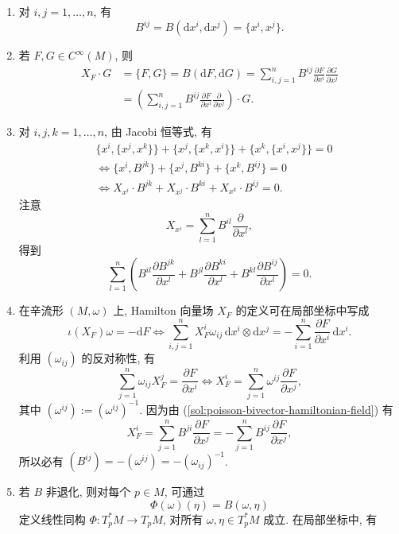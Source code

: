 \begin{description}[font=\normalfont,leftmargin=2em,labelwidth=1.5em]
\begin{enumerate}[label=(\alph*),ref=\alph*,leftmargin=*]
\item 对 $i,j=1,\ldots,n$, 有
\[
  B^{ij}=B(\mathrm{d}x^i,\mathrm{d}x^j)=\{x^i,x^j\}.
\]
\item\label{sol:poisson-bivector-hamiltonian-field} 若 $F,G\in C^\infty(M)$, 则
\begin{align*}
  X_F\cdot G
  &=\{F,G\}=B(\mathrm{d}F,\mathrm{d}G)
   =\sum_{i,j=1}^n B^{ij}\frac{\partial F}{\partial x^i}\frac{\partial G}{\partial x^j}\\
  &=\left(\sum_{i,j=1}^n B^{ij}\frac{\partial F}{\partial x^i}
                                 \frac{\partial}{\partial x^j}\right)\cdot G.
\end{align*}
\item\label{sol:poisson-bivector-jacobi-identities} 对 $i,j,k=1,\ldots,n$, 由 Jacobi 恒等式, 有
\begin{align*}
  &\{x^i,\{x^j,x^k\}\}+\{x^j,\{x^k,x^i\}\}+\{x^k,\{x^i,x^j\}\}=0\\
  &\iff\{x^i,B^{jk}\}+\{x^j,B^{ki}\}+\{x^k,B^{ij}\}=0\\
  &\iff X_{x^i}\cdot B^{jk}+X_{x^j}\cdot B^{ki}+X_{x^k}\cdot B^{ij}=0.
\end{align*}
注意
\[
  X_{x^i}=\sum_{l=1}^n B^{il}\frac{\partial}{\partial x^l},
\]
得到
\[
  \sum_{l=1}^n\left(B^{il}\frac{\partial B^{jk}}{\partial x^l}
      +B^{jl}\frac{\partial B^{ki}}{\partial x^l}
      +B^{kl}\frac{\partial B^{ij}}{\partial x^l}\right)=0.
\]
\item 在辛流形 $(M,\omega)$ 上, Hamilton 向量场 $X_F$ 的定义可在局部坐标中写成
\[
  \iota(X_F)\omega=-\mathrm{d}F\iff
  \sum_{i,j=1}^n X_F^i\omega_{ij}\,\mathrm{d}x^i\otimes\mathrm{d}x^j
    =-\sum_{i=1}^n\frac{\partial F}{\partial x^i}\,\mathrm{d}x^i.
\]
利用 $(\omega_{ij})$ 的反对称性, 有
\[
  \sum_{j=1}^n\omega_{ij}X_F^j=\frac{\partial F}{\partial x^i}
     \iff X_F^i=\sum_{j=1}^n\omega^{ij}\frac{\partial F}{\partial x^j},
\]
其中 $(\omega^{ij}):=(\omega^{ij})^{-1}$. 因为由 (\ref{sol:poisson-bivector-hamiltonian-field}) 有
\[
  X_F^i=\sum_{j=1}^n B^{ji}\frac{\partial F}{\partial x^j}
         =-\sum_{j=1}^n B^{ij}\frac{\partial F}{\partial x^j},
\]
所以必有 $(B^{ij})=-(\omega^{ij})=-(\omega_{ij})^{-1}$.
\item 若 $B$ 非退化, 则对每个 $p\in M$, 可通过
\[
  \Phi(\omega)(\eta)=B(\omega,\eta)
\]
定义线性同构 $\Phi:T_p^*M\to T_pM$, 对所有 $\omega,\eta\in T_p^*M$ 成立. 在局部坐标中, 有

\end{enumerate}
\end{description}
